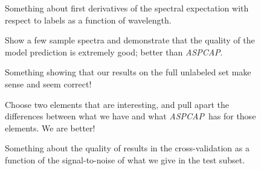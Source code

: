 \documentclass[12pt,preprint]{aastex}
\newcommand{\project}[1]{\textsl{#1}}
\newcommand{\acronym}[1]{\small{#1}}
\newcommand{\aspcap}{\project{\acronym{ASPCAP}}}
\begin{document}
\begin{figure}[p]
\caption{Something about first derivatives of the spectral expectation
  with respect to labels as a function of
  wavelength.\label{fig:derivatives}}
\end{figure}

\begin{figure}[p]
\caption{Show a few sample spectra and demonstrate that the quality of
  the model prediction is extremely good; better than
  \aspcap.\label{fig:correctness}}
\end{figure}

\begin{figure}[p]
\caption{Something showing that our results on the full unlabeled set
  make sense and seem correct!\label{fig:fulltest}}
\end{figure}

\begin{figure}[p]
\caption{Choose two elements that are interesting, and pull apart the
  differences between what we have and what \aspcap\ has for those
  elements.  We are better!\label{fig:elements}}
\end{figure}

\begin{figure}[p]
\caption{Something about the quality of results in the
  cross-validation as a function of the signal-to-noise of what we
  give in the test subset.\label{fig:snr}}
\end{figure}
\end{document}
